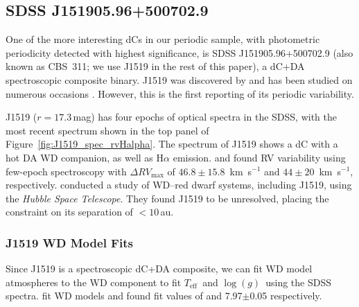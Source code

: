 \documentclass[twocolumn]{aastex631}
\newcommand{\teff}{$T_{\mathrm{eff}}$}
\newcommand{\logg}{$\log(g)$}
\begin{document}
\subsection{SDSS J151905.96+500702.9}\label{subsec:229+50}

One of the more interesting dCs in our periodic sample, with photometric periodicity detected with highest significance, is SDSS J151905.96+500702.9 (also known as CBS~311; we use J1519 in the rest of this paper), a dC+DA spectroscopic composite binary. J1519 was discovered by \citet{Liebert1994} and has been studied on numerous occasions \citep{Farihi2010, Green2013, Whitehouse2018, Ashley2019, Roulston2019, Green2019}. However, this is the first reporting of its periodic variability.


J1519 ($r=17.3$\,mag) has four epochs of optical spectra in the SDSS, with the most recent spectrum shown in the top panel of Figure~\ref{fig:J1519_spec_rvHalpha}. The spectrum of J1519 shows a dC with a hot DA WD companion, as well as H$\alpha$ emission. \citet{Whitehouse2018} and \citet{Roulston2019} found RV variability using few-epoch spectroscopy with $\Delta RV_{\textrm{max}}$ of $46.8\pm15.8$~km~s$^{-1}$ and  $44\pm20$~km~s$^{-1}$, respectively. \citet{Farihi2010} conducted a study of WD–red dwarf systems, including J1519, using the \textit{Hubble Space Telescope}. They found J1519 to be unresolved, placing the constraint on its separation of $<10$\,au. 

\subsubsection{J1519 WD Model Fits}\label{subsec:wdprop}

Since J1519 is a spectroscopic dC+DA composite, we can fit WD model atmospheres to the WD component to fit \teff\ and \logg\ using the SDSS spectra. \citet{Bedard2021} fit WD models and found fit values of  and 7.97$\pm$0.05 respectively.  
\end{document}
